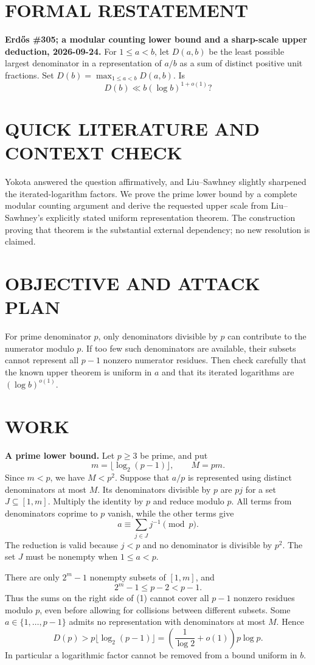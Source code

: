 \section{FORMAL RESTATEMENT}
\textbf{Erd\H{o}s \#305; a modular counting lower bound and a sharp-scale upper deduction, 2026-09-24.}
For $1\leq a<b$, let $D(a,b)$ be the least possible largest denominator in a representation of $a/b$ as a sum of distinct positive unit fractions. Set $D(b)=\max_{1\leq a<b}D(a,b)$. Is
\[
D(b)\ll b(\log b)^{1+o(1)}?
\]

\section{QUICK LITERATURE AND CONTEXT CHECK}
Yokota answered the question affirmatively, and Liu--Sawhney slightly sharpened the iterated-logarithm factors. We prove the prime lower bound by a complete modular counting argument and derive the requested upper scale from Liu--Sawhney's explicitly stated uniform representation theorem. The construction proving that theorem is the substantial external dependency; no new resolution is claimed.

\section{OBJECTIVE AND ATTACK PLAN}
For prime denominator $p$, only denominators divisible by $p$ can contribute to the numerator modulo $p$. If too few such denominators are available, their subsets cannot represent all $p-1$ nonzero numerator residues. Then check carefully that the known upper theorem is uniform in $a$ and that its iterated logarithms are $(\log b)^{o(1)}$.

\section{WORK}
\textbf{A prime lower bound.} Let $p\geq3$ be prime, and put
\[
m=\lfloor\log_2(p-1)\rfloor,\qquad M=pm.
\]
Since $m<p$, we have $M<p^2$. Suppose that $a/p$ is represented using distinct denominators at most $M$. Its denominators divisible by $p$ are $pj$ for a set $J\subseteq[1,m]$. Multiply the identity by $p$ and reduce modulo $p$. All terms from denominators coprime to $p$ vanish, while the other terms give
\[
a\equiv\sum_{j\in J}j^{-1}\pmod p.
\tag{1}
\]
The reduction is valid because $j<p$ and no denominator is divisible by $p^2$. The set $J$ must be nonempty when $1\leq a<p$.

There are only $2^m-1$ nonempty subsets of $[1,m]$, and
\[
2^m-1\leq p-2<p-1.
\]
Thus the sums on the right side of (1) cannot cover all $p-1$ nonzero residues modulo $p$, even before allowing for collisions between different subsets. Some $a\in\{1,\ldots,p-1\}$ admits no representation with denominators at most $M$. Hence
\[
D(p)>p\lfloor\log_2(p-1)\rfloor
=\left(\frac1{\log2}+o(1)\right)p\log p.
\tag{2}
\]
In particular a logarithmic factor cannot be removed from a bound uniform in $b$.

